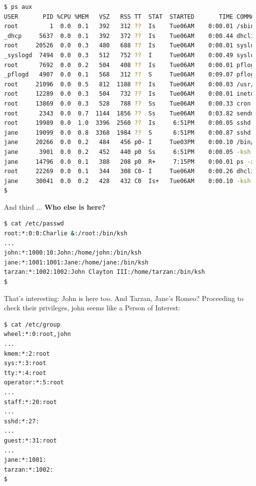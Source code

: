 \begin{lstlisting}[language=bash,caption={What's going on here?}]
$ ps aux
USER       PID %CPU %MEM   VSZ   RSS TT  STAT  STARTED       TIME COMMAND
root         1  0.0  0.1   392   312 ??  Is    Tue06AM    0:00.01 /sbin/init
_dhcp     5637  0.0  0.1   392   372 ??  Is    Tue06AM    0:00.44 dhclient: vic
root     20526  0.0  0.3   480   688 ??  Is    Tue06AM    0:00.01 syslogd: [pri
_syslogd  7494  0.0  0.3   512   752 ??  I     Tue06AM    0:00.49 syslogd -a /v
root      7692  0.0  0.2   504   408 ??  Is    Tue06AM    0:00.01 pflogd: [priv
_pflogd   4907  0.0  0.1   568   312 ??  S     Tue06AM    0:09.07 pflogd: [runn
root     21096  0.0  0.5   812  1188 ??  Is    Tue06AM    0:00.03 /usr/sbin/ssh
root     12289  0.0  0.3   504   732 ??  Is    Tue06AM    0:00.01 inetd
root     13869  0.0  0.3   528   788 ??  Ss    Tue06AM    0:00.33 cron
root      2343  0.0  0.7  1144  1856 ??  Ss    Tue06AM    0:03.82 sendmail: acc
root     19989  0.0  1.0  3396  2560 ??  Is     6:51PM    0:00.05 sshd: jane [p
jane     19099  0.0  0.8  3368  1984 ??  S      6:51PM    0:00.87 sshd: jane@tt
jane     20266  0.0  0.2   484   456 p0- I     Tue03PM    0:00.10 /bin/sh /bin/
jane      3901  0.0  0.2   452   440 p0  Ss     6:51PM    0:00.05 -ksh (ksh)
jane     14796  0.0  0.1   388   208 p0  R+     7:15PM    0:00.01 ps -aux
root     22269  0.0  0.1   344   308 C0- I     Tue06AM    0:00.26 dhclient: vic
jane     30041  0.0  0.2   428   432 C0  Is+   Tue06AM    0:00.10 -ksh (ksh)
$
\end{lstlisting}

And third ... \textbf{Who else is here?}

\begin{lstlisting}[language=bash,caption={Who lives here?}]
$ cat /etc/passwd                                                              
root:*:0:0:Charlie &:/root:/bin/ksh
...
john:*:1000:10:John:/home/john:/bin/ksh
jane:*:1001:1001:Jane:/home/jane:/bin/ksh
tarzan:*:1002:1002:John Clayton III:/home/tarzan:/bin/ksh
$
\end{lstlisting}

That's interesting: John is here too. And Tarzan, Jane's Romeo? Proceeding to check their privileges, john seems like a Person of Interest:


\begin{lstlisting}[language=bash,caption={Who's the boss?}]
$ cat /etc/group                                                               
wheel:*:0:root,john
...
kmem:*:2:root
sys:*:3:root
tty:*:4:root
operator:*:5:root
...
staff:*:20:root
...
sshd:*:27:
...
guest:*:31:root
...
jane:*:1001:
tarzan:*:1002:
$ 
\end{lstlisting}

